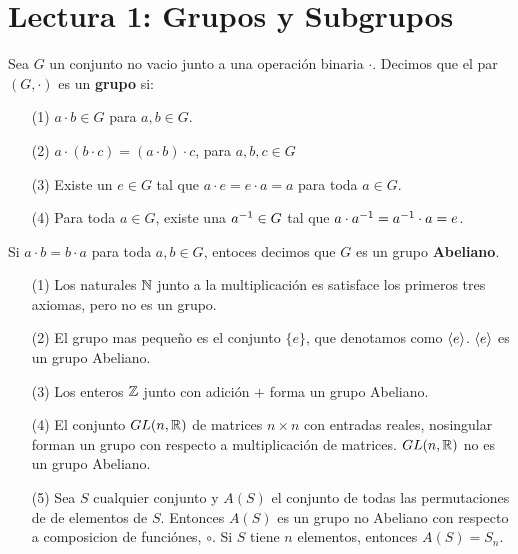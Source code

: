 \section*{Lectura 1: Grupos y Subgrupos}

\begin{definition}
    Sea $G$ un conjunto no vacio junto a una operaci\'on binaria  $\cdot$.
    Decimos que el par  $(G,\cdot)$ es un \textbf{grupo} si:
    \begin{enumerate}
        \item[(1)] $a \cdot b \in G$ para $a,b \in G$.

        \item[(2)] $a \cdot (b \cdot c)= (a \cdot b) \cdot c$, para $a,b,c \in G$

        \item[(3)] Existe un $e \in G$ tal que  $a \cdot e=e \cdot a=a$ para
            toda  $a \in G$.

        \item [(4)] Para toda $a \in G$, existe una  $a^{-1} \in G$ tal que $a
            \cdot a^{-1}=a^{-1} \cdot a=e$.
    \end{enumerate}
    Si $a \cdot b = b \cdot a$ para toda  $a,b \in G$, entoces decimos que  $G$
    es un grupo  \textbf{Abeliano}.
\end{definition}

\begin{example}\label{}
    \begin{enumerate}
        \item[(1)] Los naturales $\mathbb{N}$ junto a la multiplicaci\'on es  satisface
            los primeros tres axiomas, pero no es un grupo.

        \item[(2)] El grupo mas peque\~no es el conjunto $\{e\}$, que denotamos
            como $\langle e\rangle$. $\langle e\rangle$ es un grupo Abeliano.

        \item[(3)] Los enteros $\mathbb{Z}$ junto con adici\'on  $+$ forma un grupo
            Abeliano.

        \item[(4)] El conjunto $GL(n,\mathbb{R})$ de matrices $n \times n$ con entradas
            reales, nosingular forman un grupo con respecto a multiplicaci\'on
            de matrices. $GL(n,\mathbb{R})$ no es un grupo Abeliano.

        \item[(5)] Sea $S$ cualquier conjunto y  $A(S)$ el conjunto de todas las
            permutaciones de de elementos de $S$. Entonces  $A(S)$ es un grupo
            no Abeliano con respecto a composicion de funci\'ones, $\circ$. Si
            $S$ tiene  $n$ elementos, entonces  $A(S)=S_n$.
    \end{enumerate}
\end{example}

